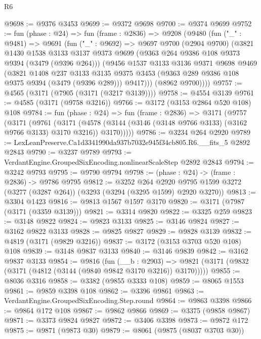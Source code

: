 \begin{lexlean}{R6}
\begin{coremodule}
@9698 := @9376 @3453
@9699 := @9372 @9698
@9700 := @9374 @9699
@9752 := fun (phase : @24) =>
  fun (frame : @2836) =>
  @9208
    (@9480
      (fun ("_" : @9481) =>
      @9691
        (fun ("_" : @9692) =>
        @9697
          @9700
          (@2904 @9700)
          (@3821
            @1430
            @1538
            @3133
            @3137
            @9373
            @9699
            (@9363 @264 @9386 @108 @9373 @9394 (@3479 (@9396 @264)))
            (@9456
              @1537
              @3133
              @3136
              @9371
              @9698
              @9469
              (@3821
                @1408
                @237
                @3133
                @3135
                @9375
                @3453
                (@9363 @289 @9386 @108 @9375 @9394 (@3479 (@9396 @289)))
                @9417)))
          (@8962 @9700))))
@9757 := @4565 (@3171 (@7905 (@3171 (@3217 @3139))))
@9758 := @4554 @3139
@9761 := @4585 (@3171 (@9758 @3216))
@9766 := @3172 (@3153 @2864 @520 @108) @108
@9784 := fun (phase : @24) =>
  fun (frame : @2836) =>
  @3171
    (@9757
      (@3171
        (@9761
          (@3171
            (@4578 (@3144 (@3146 (@3148 @9766 @3133) (@3162 @9766 @3133) @3170 @3216)) @3170)))))
@9786 := @3234 @264 @2920
@9789 := LexLeanPreserve.Ca1d3341990da937b7032e945f34cb805.R6.__fits_5 @2892 @2843
@9790 := @3237 @9789
@9793 := VerdantEngine.GroupedSixEncoding.nonlinearScaleStep @2892 @2843
@9794 := @3242 @9793
@9795 := @9790 @9794
@9798 := (phase : @24) -> (frame : @2836) -> @9786 @9795
@9812 := @3252
    @264
    @2920
    @9795
    @1599
    @3272
    (@3277 (@3287 @264))
    (@3293 (@3294 (@3295 @1599) @2920 @3270))
@9813 := @3304 @1423
@9816 := @9813 @1567 @1597 @3170
@9820 := @3171 (@7987 (@3171 (@3359 @3139)))
@9821 := @3314 @9820
@9822 := @3325 @259
@9823 := @3148 @9822
@9824 := @9823 @3133
@9825 := @3146 @9824
@9827 := @3162 @9822 @3133
@9828 := @9825 @9827
@9829 := @9828 @3139
@9832 := @4819 (@3171 (@9829 @3216))
@9837 := @3172 (@3153 @3703 @520 @108) @108
@9839 := @3148 @9837 @3133
@9840 := @3146 @9839
@9842 := @3162 @9837 @3133
@9854 := @9816
    (fun (__b : @2903) =>
    @9821 (@3171 (@9832 (@3171 (@4812 (@3144 (@9840 @9842 @3170 @3216)) @3170)))))
@9855 := @8036 @3316
@9858 := @3382 (@9855 @3333 @108)
@9859 := @8065 @1553
@9861 := @9859 @3398 @108
@9862 := @3396 @9861
@9863 := VerdantEngine.GroupedSixEncoding.Step.round
@9864 := @9863 @3398
@9866 := @9864 @172 @108
@9867 := @9862 @9866
@9869 := @3375 (@9858 @9867)
@9871 := @3373 @9824 @9827
@9872 := @3406 @3398
@9873 := @9872 @172
@9875 := @9871 (@9873 @30)
@9879 := @8061 (@9875 (@8037 @3703 @30))

\end{coremodule}
\end{lexlean}
